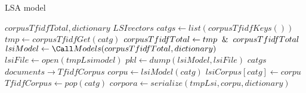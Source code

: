 \label{alg:LSAmodel}
\renewcommand{\algorithmicrequire}{\textbf{input:}}
\renewcommand{\algorithmicensure}{\textbf{output:}}

\begin{algorithm}
  \caption{LSA model}
    \begin{algorithmic}[1]
        \Require $corpusTfidfTotal, dictionary$
        \Ensure  $LSI vectors$
            \State $catgs \gets list(corpusTfidfKeys())$
            \State {}
                      \State $tmp \gets corpusTfidfGet(catg)$
                      \State $ corpusTfidfTotal \gets tmp \And corpusTfidfTotal$
            \State $lsiModel \gets \Call Models(corpusTfidfTotal, dictionary)$
            \State $lsiFile \gets open(tmpLsimodel)$
            \State $pkl \gets dump(lsiModel, lsiFile)$
            \State{}
        \EndFunction
        \State
            \State \For $catgs$
                      \State \For $documents \to TfidfCorpus$
                                \State $ corpu \gets lsiModel(catg)$
                                \State $lsiCorpus[catg] \gets corpu$
                                \State $TfidfCorpus \gets pop(catg)$
                                \State $corpora \gets serialize(tmpLsi, corpu, dictionary)$
            \State {}
        \EndFunction
    \end{algorithmic}
\end{algorithm}

